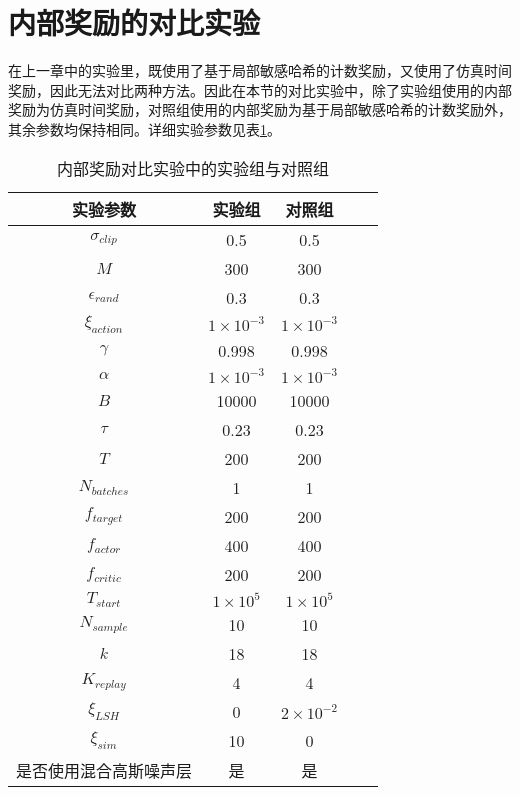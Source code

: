 \section{内部奖励的对比实验}

在上一章中的实验里，既使用了基于局部敏感哈希的计数奖励，又使用了仿真时间奖励，因此无法对比两种方法。因此在本节的对比实验中，除了实验组使用的内部奖励为仿真时间奖励，对照组使用的内部奖励为基于局部敏感哈希的计数奖励外，其余参数均保持相同。详细实验参数见表\ref{simcmp}。
    \begin{table}[htbp]
        \caption{内部奖励对比实验中的实验组与对照组}
        \label{simcmp}
    \vspace{0.5em}\centering\wuhao
    \begin{tabular}{ccccc}
    \toprule[1.5pt]
        实验参数 & 实验组 & 对照组\\
    \midrule[1pt]
        $\sigma_{clip}$         & 0.5               & 0.5               \\
        $M$                     & 300               & 300               \\
        $\epsilon_{rand}$       & 0.3               & 0.3               \\
        $\xi_{action}$          & $1\times 10^{-3}$ & $1\times 10^{-3}$ \\
        $\gamma$                & 0.998             & 0.998             \\
        $\alpha$                & $1\times 10^{-3}$ & $1\times 10^{-3}$ \\
        $B$                     & 10000             & 10000             \\
        $\tau$                  & 0.23              & 0.23              \\
        $T$                     & 200               & 200               \\
        $N_{batches}$           & 1                 & 1                 \\
        $f_{target}$            & 200               & 200               \\
        $f_{actor}$             & 400               & 400               \\
        $f_{critic}$            & 200               & 200               \\
        $T_{start}$             & $1\times 10^5$    & $1\times 10^5$    \\
        $N_{sample}$            & 10                & 10                \\
        $k$                     & 18                & 18                \\
        $K_{replay}$            & 4                 & 4                 \\
        $\xi_{LSH}$             & 0                 & $2\times 10^{-2}$ \\
        $\xi_{sim}$             & 10                & 0                 \\
        是否使用混合高斯噪声层  & 是                & 是                \\
    \bottomrule[1.5pt]
    \end{tabular}
    \end{table}
